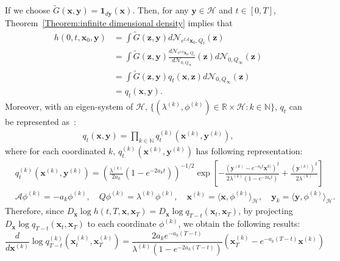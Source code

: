 \documentclass[nohyperref]{article}
\theoremstyle{plain}
\theoremstyle{remark}
\newcommand{\la}{\langle}
\newcommand{\ra}{\rangle}
\newcommand{\mc}{\mathcal}
\newcommand{\mb}{\mathbf}
\begin{document}
If we choose $\tilde{G}(\mb{x}, \mb{y}) = \mb{1}_{d\mb{y}}(\mb{x})$. Then, for any $\mb{y} \in \mc{H}$ and $t \in [0, T]$,  Theorem~\ref{Theorem:infinite dimensional density} implies that
\begin{align}
    h(0, t, \mb{x}_0, \mb{y}) &= \int \tilde{G}(\mb{z}, \mb{y}) d\mc{N}_{e^{t\mc{A}}\mb{x}_0, Q_t}(\mb{z}) \\
    & = \int \tilde{G}(\mb{z}, \mb{y}) \frac{d\mc{N}_{e^{t\mc{A}}\mb{x}_0, Q_t}}{d\mc{N}_{0, Q_{\infty}}}(\mb{z})  d\mc{N}_{0, Q_{\infty}}(\mb{z}) \\
    & = \int \tilde{G}(\mb{z}, \mb{y}) q_t(\mb{x}, \mb{z})  d\mc{N}_{0, Q_{\infty}}(\mb{z})  \\
    & = q_t(\mb{x}, \mb{y}).
\end{align}
Moreover, with an eigen-system of $\mc{H}$, $\{(\lambda^{(k)}, \phi^{(k)}) \in \mathbb{R} \times \mc{H} : k \in \mathbb{N}\}$, $q_t$ can be represented as~\citep{doi:10.1080/07362999308809319}:
\begin{align}\label{eq:orthonormal_1}
    q_t(\mb{x}, \mb{y}) = \prod_{k \in \mathbb{N}} q_t^{(k)} (\mb{x}^{(k)}, \mb{y}^{(k)}),
\end{align}
where for each coordinated $k$, $q_t^{(k)} (\mb{x}^{(k)}, \mb{y}^{(k)})$ has following representation:
\begin{align}\label{eq:orthonormal_2}
    & q_t^{(k)} (\mb{x}^{(k)}, \mb{y}^{(k)}) = \left(\frac{\lambda^{(k)}}{2a_k}(1 - e^{-2a_k t})\right)^{-1/2} \exp \left[- \frac{(\mb{y}^{(k)} - e^{-a_k t}\mb{x}^{k)})^2}{2\lambda^{(k)}(1 - e^{-2a_k t})} + \frac{(\mb{y}^{(k)})^2}{2\lambda^{(k)}}\right] \\
    & \mc{A}\phi^{(k)} = -a_k \phi^{(k)}, \quad Q \phi^{(k)} = \lambda^{(k)}\phi^{(k)}, \quad \mb{x}^{(k)} = \la \mb{x}, \phi^{(k)}\ra_{\mc{H}}, \quad \mb{y}_k = \la \mb{y}, \phi^{(k)}\ra_{\mc{H}}.\label{eq:orthonormal_3}
\end{align}
Therefore, since $D_{\mb{x}} \log h(t, T, \mb{x}, \mb{x}_T) = D_\mb{x}  \log q_{T-t}(\mb{x}_t, \mb{x}_T)$, by projecting $D_\mb{x}  \log q_{T-t}(\mb{x}_t, \mb{x}_T)$ to each coordinate $\phi^{(k)}$, we obtain the following results:
\begin{equation}\label{eq:orthonormal_4}
    \frac{d}{d\mb{x}^{(k)}} \log q_{T-t}^{(k)}(\mb{x}_t^{(k)}, \mb{x}_T^{(k)}) = \frac{2a_k e^{-a_k (T-t)}}{\lambda^{(k)}(1 - e^{-2a_k (T-t)})}(\mb{x}^{(k)}_T - e^{-a_k (T-t)}\mb{x}^{(k)})
\end{equation}
\end{document}
